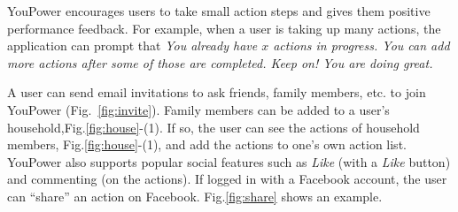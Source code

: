 \documentclass[a4paper]{article}
\begin{document}
YouPower encourages users to take small action steps and gives them positive performance feedback. For example, when a user is taking up many actions, the application can prompt that \textit{You already have $x$ actions in progress. You can add more actions after some of those are completed. Keep on! You are doing great.} 

A user can send email invitations to ask friends, family members, etc. to join YouPower (Fig.~\ref{fig:invite}). Family members can be added to a user's household,Fig.\ref{fig:house}-(1). If so, the user can see the actions of household members, Fig.\ref{fig:house}-(1), and add the actions to one's own action list. YouPower also supports popular social features such as \textit{Like} (with a \textit{Like} button) and commenting (on the actions). If logged in with a Facebook account, the user can ``share'' an action on Facebook. Fig.\ref{fig:share} shows an example.
\end{document}
